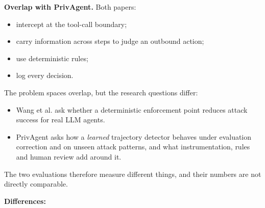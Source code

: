 \documentclass[10pt]{article}
\begin{document}
\textbf{Overlap with PrivAgent.} Both papers:

\begin{itemize}
\item intercept at the tool-call boundary;
\item carry information across steps to judge an outbound action;
\item use deterministic rules;
\item log every decision.
\end{itemize}

The problem spaces overlap, but the research questions differ:

\begin{itemize}
\item Wang et al. ask whether a deterministic enforcement point reduces attack success for real LLM agents.
\item PrivAgent asks how a \emph{learned} trajectory detector behaves under evaluation correction and on unseen attack patterns, and what instrumentation, rules and human review add around it.
\end{itemize}

The two evaluations therefore measure different things, and their numbers are not directly comparable.

\textbf{Differences:}
\end{document}
